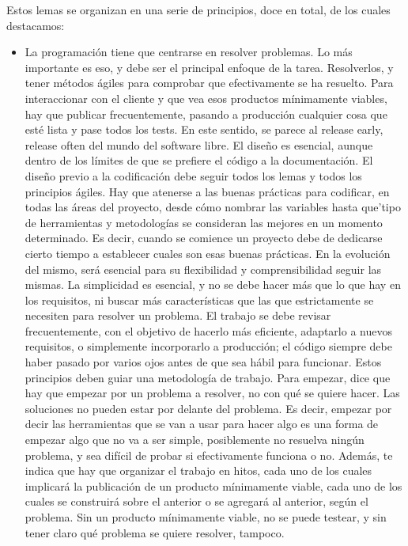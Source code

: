Estos lemas se organizan en una serie de principios, doce en total, de los cuales destacamos:

\begin{itemize}
    \item 

La programación tiene que centrarse en resolver problemas. 
Lo más importante es eso, y debe ser el principal enfoque 
de la tarea. Resolverlos, y tener métodos ágiles para comprobar 
que efectivamente se ha resuelto.
Para interaccionar con el cliente y que vea esos productos 
mínimamente viables, hay que publicar frecuentemente, 
pasando a producción cualquier cosa que esté lista y 
pase todos los tests. En este sentido, se parece al 
release early, release often del mundo del software libre.
El diseño es esencial, aunque dentro de los límites de 
que se prefiere el código a la documentación. El diseño 
previo a la codificación debe seguir todos los lemas y 
todos los principios ágiles.
Hay que atenerse a las buenas prácticas para codificar, 
en todas las áreas del proyecto, desde cómo nombrar 
las variables hasta que’tipo de herramientas y metodologías 
se consideran las mejores en un momento determinado. 
Es decir, cuando se comience un proyecto debe de 
dedicarse cierto tiempo a establecer cuales son 
esas buenas prácticas. En la evolución del mismo, 
será esencial para su flexibilidad y comprensibilidad seguir las mismas.
La simplicidad es esencial, y no se debe hacer más 
que lo que hay en los requisitos, ni buscar más 
características que las que estrictamente se necesiten 
para resolver un problema.
El trabajo se debe revisar frecuentemente, con el objetivo 
de hacerlo más eficiente, adaptarlo a nuevos requisitos, 
o simplemente incorporarlo a producción; el código siempre 
debe haber pasado por varios ojos antes de que sea hábil para funcionar.
Estos principios deben guiar una metodología de trabajo. 
Para empezar, dice que hay que empezar por un problema a 
resolver, no con qué se quiere hacer. Las soluciones no 
pueden estar por delante del problema. Es decir, empezar 
por decir las herramientas que se van a usar para hacer 
algo es una forma de empezar algo que no va a ser simple, 
posiblemente no resuelva ningún problema, y sea difícil 
de probar si efectivamente funciona o no. Además, te 
indica que hay que organizar el trabajo en hitos, 
cada uno de los cuales implicará la publicación de 
un producto mínimamente viable, cada uno de los 
cuales se construirá sobre el anterior o se agregará 
al anterior, según el problema. Sin un producto 
mínimamente viable, no se puede testear, y sin tener 
claro qué problema se quiere resolver, tampoco.


\end{itemize}
